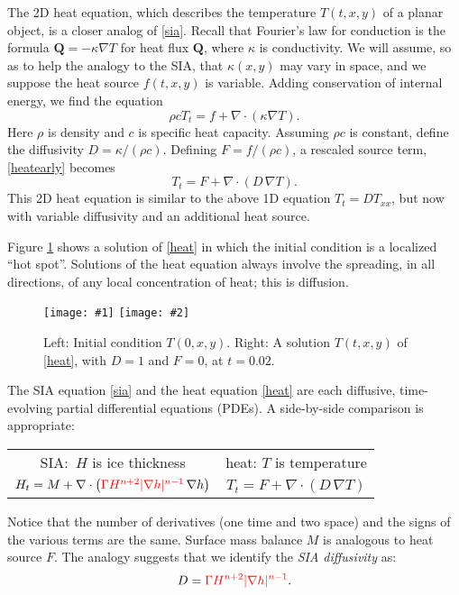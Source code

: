 \documentclass[letterpaper,final,12pt,reqno]{amsart}
\newcommand{\grad}{\nabla}
\newcommand{\Div}{\nabla\cdot}
\newcommand{\twofigsizes}[5]{
\begin{figure}[ht]
\centering
\texttt{[image: \#1]} \quad
\texttt{[image: \#2]}
\caption{#3}
\label{fig:#1}
\end{figure}}
\begin{document}
The 2D heat equation, which describes the temperature $T(t,x,y)$ of a planar object, is a closer analog of \eqref{sia}.  Recall that Fourier's law for conduction is the formula $\mathbf{Q} = - \kappa \grad T$ for heat flux $\mathbf{Q}$, where $\kappa$ is conductivity.  We will assume, so as to help the analogy to the SIA, that $\kappa(x,y)$ may vary in space, and we suppose the heat source $f(t,x,y)$ is variable.  Adding conservation of internal energy, we find the equation
\begin{equation}
\rho c T_t = f + \Div (\kappa \grad T). \label{heatearly}
\end{equation}
Here $\rho$ is density and $c$ is specific heat capacity.  Assuming $\rho c$ is constant, define the diffusivity $D=\kappa/(\rho c)$.  Defining $F = f/(\rho c)$, a rescaled source term, \eqref{heatearly} becomes
\begin{equation}
T_t = F + \Div (D\, \grad T). \label{heat}
\end{equation}
This 2D heat equation is similar to the above 1D equation $T_t = D T_{xx}$, but now with variable diffusivity and an additional heat source.

Figure \ref{fig:initialheat} shows a solution of \eqref{heat} in which the initial condition is a localized ``hot spot''.  Solutions of the heat equation always involve the spreading, in all directions, of any local concentration of heat; this is diffusion.

\twofigsizes{initialheat}{finalheat}{Left: Initial condition $T(0,x,y)$.   Right: A solution $T(t,x,y)$ of  \eqref{heat}, with $D=1$ and $F=0$, at $t=0.02$.}{2.8in}{2.8in}

The SIA equation \eqref{sia} and the heat equation \eqref{heat} are each diffusive, time-evolving partial differential equations (PDEs).  A side-by-side comparison is appropriate:
\begin{center}
\begin{tabular}{cc}
\vspace{1mm}
SIA:\, $H$ is ice thickness & \phantom{foo bar} heat: $T$ is temperature\phantom{foo bar}  \\
\vspace{1mm}
	$H_t = M + \Div \left({\color{red}\Gamma H^{n+2} |\grad h|^{n-1}}\, \grad h \right)$  &  $T_t = F + \Div (D\, \grad T)$
\end{tabular}
\end{center}
\vspace{1mm}
Notice that the number of derivatives (one time and two space) and the signs of the various terms are the same.  Surface mass balance $M$ is analogous to heat source $F$.  The analogy suggests that we identify the \emph{SIA diffusivity} as:
\begin{equation}
	D = {\color{red}\Gamma H^{n+2} |\grad h|^{n-1}}.  \label{siadiffusivity}
\end{equation}
\end{document}
